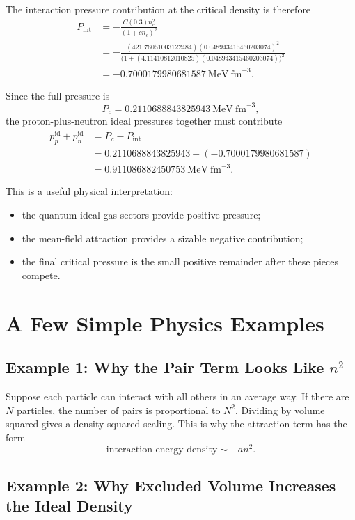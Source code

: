 \documentclass[11pt]{article}
\begin{document}
The interaction pressure contribution at the critical density is therefore
\begin{align}
P_{\mathrm{int}}
&=
-\frac{C(0.3)n_c^2}{(1+cn_c)^2} \\
&=
-\frac{(421.76051003122484)(0.048943415460203074)^2}
{\big(1+(4.11410812010825)(0.048943415460203074)\big)^2} \\
&=
-0.7000179980681587\ \mathrm{MeV\ fm}^{-3}.
\end{align}

Since the full pressure is
\[
P_c=0.2110688843825943\ \mathrm{MeV\ fm}^{-3},
\]
the proton-plus-neutron ideal pressures together must contribute
\begin{align}
p_p^{\mathrm{id}}+p_n^{\mathrm{id}}
&=
P_c-P_{\mathrm{int}} \\
&=
0.2110688843825943-(-0.7000179980681587) \\
&=
0.911086882450753\ \mathrm{MeV\ fm}^{-3}.
\end{align}

This is a useful physical interpretation:
\begin{itemize}
\item the quantum ideal-gas sectors provide positive pressure;
\item the mean-field attraction provides a sizable negative contribution;
\item the final critical pressure is the small positive remainder after these
pieces compete.
\end{itemize}

\section{A Few Simple Physics Examples}

\subsection{Example 1: Why the Pair Term Looks Like \texorpdfstring{$n^2$}{n2}}

Suppose each particle can interact with all others in an average way. If there
are $N$ particles, the number of pairs is proportional to $N^2$. Dividing by
volume squared gives a density-squared scaling. This is why the attraction term
has the form
\[
\text{interaction energy density} \sim -a n^2.
\]

\subsection{Example 2: Why Excluded Volume Increases the Ideal Density}
\end{document}
